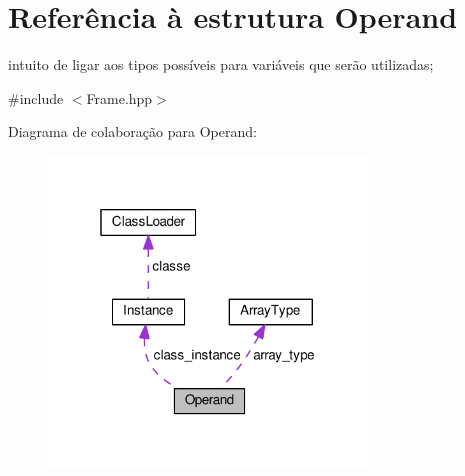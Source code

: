 \hypertarget{struct_operand}{}\section{Referência à estrutura Operand}
\label{struct_operand}


intuito de ligar aos tipos possíveis para variáveis que serão utilizadas;  




{\ttfamily \#include $<$Frame.\+hpp$>$}



Diagrama de colaboração para Operand\+:
\nopagebreak
\begin{figure}[H]
\begin{center}
\leavevmode
\includegraphics[width=241pt]{struct_operand__coll__graph}
\end{center}
\end{figure}
